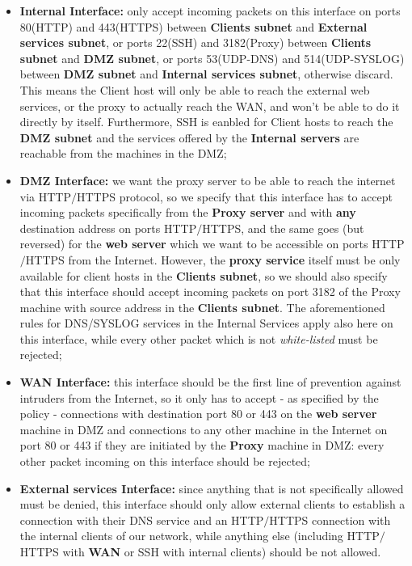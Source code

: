 \begin{itemize}
\item \textbf{Internal Interface:} only accept incoming packets on this interface on ports 80(HTTP) and 443(HTTPS) between \textbf{Clients subnet} and \textbf{External services subnet}, or ports 22(SSH) and 3182(Proxy) between \textbf{Clients subnet} and \textbf{DMZ subnet}, or ports 53(UDP-DNS) and 514(UDP-SYSLOG) between \textbf{DMZ subnet} and \textbf{Internal services subnet}, otherwise discard. This means the Client host will only be able to reach the external web services, or the proxy to actually reach the WAN, and won't be able to do it directly by itself. Furthermore, SSH is eanbled for Client hosts to reach the \textbf{DMZ subnet} and the services offered by the \textbf{Internal servers} are reachable from the machines in the DMZ;
\item \textbf{DMZ Interface:} we want the proxy server to be able to reach the internet via HTTP$/$HTTPS protocol, so we specify that this interface has to accept incoming packets specifically from the \textbf{Proxy server} and with \textbf{any} destination address on ports HTTP$/$HTTPS, and the same goes (but reversed) for the \textbf{web server} which we want to be accessible on ports HTTP$/$HTTPS from the Internet. However, the \textbf{proxy service} itself must be only available for client hosts in the \textbf{Clients subnet}, so we should also specify that this interface should accept incoming packets on port 3182 of the Proxy machine with source address in the \textbf{Clients subnet}. The aforementioned rules for DNS/SYSLOG services in the Internal Services apply also here on this interface, while every other packet which is not \textit{white-listed} must be rejected;
\item \textbf{WAN Interface:} this interface should be the first line of prevention against intruders from the Internet, so it only has to accept - as specified by the policy - connections with destination port 80 or 443 on the \textbf{web server} machine in DMZ and connections to any other machine in the Internet on port 80 or 443 if they are initiated by the \textbf{Proxy} machine in DMZ: every other packet incoming on this interface should be rejected;
\item \textbf{External services Interface:} since anything that is not specifically allowed must be denied, this interface should only allow external clients to establish a connection with their DNS service and an HTTP$/$HTTPS connection with the internal clients of our network, while anything else (including HTTP$/$HTTPS with \textbf{WAN} or SSH with internal clients) should be not allowed.
\end{itemize}
